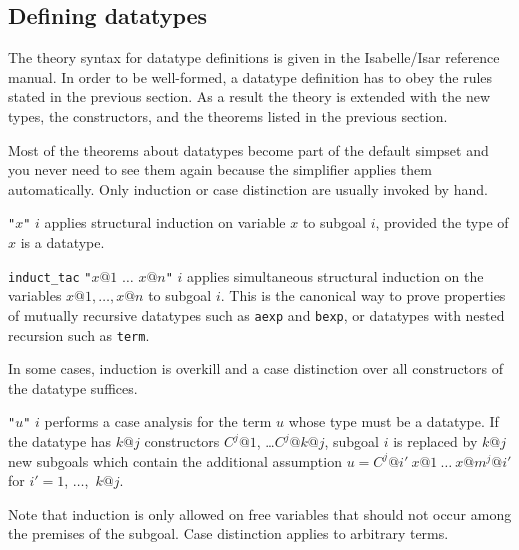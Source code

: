 \subsection{Defining datatypes}

The theory syntax for datatype definitions is given in the
Isabelle/Isar reference manual.  In order to be well-formed, a
datatype definition has to obey the rules stated in the previous
section.  As a result the theory is extended with the new types, the
constructors, and the theorems listed in the previous section.

Most of the theorems about datatypes become part of the default simpset and
you never need to see them again because the simplifier applies them
automatically.  Only induction or case distinction are usually invoked by hand.
\begin{ttdescription}
\item[\ttindexbold{induct_tac} {\tt"}$x${\tt"} $i$]
 applies structural induction on variable $x$ to subgoal $i$, provided the
 type of $x$ is a datatype.
\item[\texttt{induct_tac}
  {\tt"}$x@1$ $\ldots$ $x@n${\tt"} $i$] applies simultaneous
  structural induction on the variables $x@1,\ldots,x@n$ to subgoal $i$.  This
  is the canonical way to prove properties of mutually recursive datatypes
  such as \texttt{aexp} and \texttt{bexp}, or datatypes with nested recursion such as
  \texttt{term}.
\end{ttdescription}
In some cases, induction is overkill and a case distinction over all
constructors of the datatype suffices.
\begin{ttdescription}
\item[\ttindexbold{case_tac} {\tt"}$u${\tt"} $i$]
 performs a case analysis for the term $u$ whose type  must be a datatype.
 If the datatype has $k@j$ constructors  $C^j@1$, \dots $C^j@{k@j}$, subgoal
 $i$ is replaced by $k@j$ new subgoals which  contain the additional
 assumption $u = C^j@{i'}~x@1~\dots~x@{m^j@{i'}}$ for  $i'=1$, $\dots$,~$k@j$.
\end{ttdescription}

Note that induction is only allowed on free variables that should not occur
among the premises of the subgoal. Case distinction applies to arbitrary terms.

\bigskip


